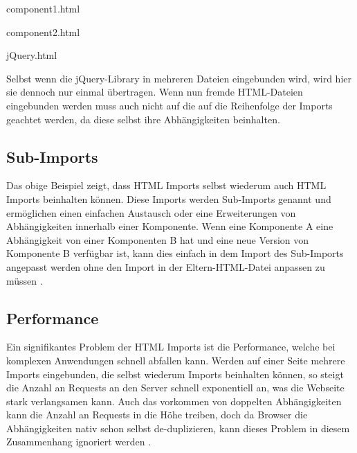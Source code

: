 component1.html
\begin{Shaded}
\begin{Highlighting}[]
\end{Highlighting}
\end{Shaded}

component2.html
\begin{Shaded}
\begin{Highlighting}[]
\end{Highlighting}
\end{Shaded}

jQuery.html
\begin{Shaded}
\begin{Highlighting}[]
\end{Highlighting}
\end{Shaded}

Selbst wenn die jQuery-Library in mehreren Dateien eingebunden wird, wird hier sie dennoch nur einmal übertragen. Wenn nun fremde HTML-Dateien eingebunden werden muss auch nicht auf die auf die Reihenfolge der Imports geachtet werden, da diese selbst ihre Abhängigkeiten beinhalten.


\subsection{Sub-Imports}\label{sub-imports}

Das obige Beispiel zeigt, dass HTML Imports selbst wiederum auch HTML Imports beinhalten können. Diese Imports werden Sub-Imports genannt und ermöglichen einen einfachen Austausch oder eine Erweiterungen von Abhängigkeiten innerhalb einer Komponente. Wenn eine Komponente A eine Abhängigkeit von einer Komponenten B hat und eine neue Version von Komponente B verfügbar ist, kann dies einfach in dem Import des Sub-Imports angepasst werden ohne den Import in der Eltern-HTML-Datei anpassen zu müssen \cite{citeulike:13853647}.


\subsection{Performance}\label{performance}

Ein signifikantes Problem der HTML Imports ist die Performance, welche bei komplexen Anwendungen schnell abfallen kann. Werden auf einer Seite mehrere Imports eingebunden, die selbst wiederum Imports beinhalten können, so steigt die Anzahl an Requests an den Server schnell exponentiell an, was die Webseite stark verlangsamen kann. Auch das vorkommen von doppelten Abhängigkeiten kann die Anzahl an Requests in die Höhe treiben, doch da Browser die Abhängigkeiten nativ schon selbst de-duplizieren, kann dieses Problem in diesem Zusammenhang ignoriert werden \cite{citeulike:13853714}.


